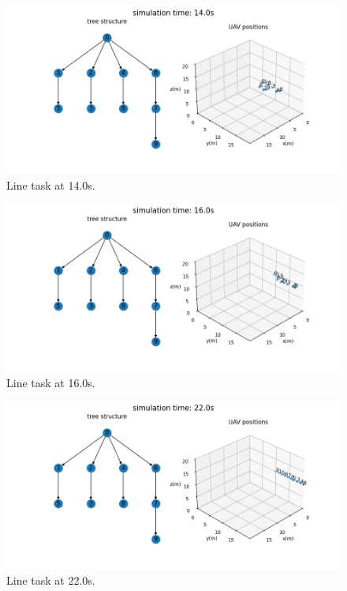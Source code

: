 \begin{figure}[htbp]
  \centering
  \includegraphics[width=0.96\linewidth]{rsc/line.11.png}
  \caption{Line task at 14.0s.}
  \label{fig:sim_line_140}
\end{figure}

\begin{figure}[htbp]
  \centering
  \includegraphics[width=0.96\linewidth]{rsc/line.12.png}
  \caption{Line task at 16.0s.}
  \label{fig:sim_line_160}
\end{figure}

\begin{figure}[htbp]
  \centering
  \includegraphics[width=0.96\linewidth]{rsc/line.15.png}
  \caption{Line task at 22.0s.}
  \label{fig:sim_line_220}
\end{figure}

